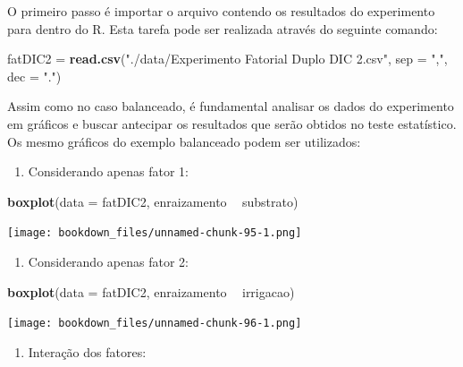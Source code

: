 \documentclass[
]{article}
\newenvironment{Shaded}{\begin{snugshade}}{\end{snugshade}}
\newcommand{\DataTypeTok}[1]{\textcolor[rgb]{0.13,0.29,0.53}{#1}}
\newcommand{\KeywordTok}[1]{\textcolor[rgb]{0.13,0.29,0.53}{\textbf{#1}}}
\newcommand{\NormalTok}[1]{#1}
\newcommand{\OperatorTok}[1]{\textcolor[rgb]{0.81,0.36,0.00}{\textbf{#1}}}
\newcommand{\StringTok}[1]{\textcolor[rgb]{0.31,0.60,0.02}{#1}}
\providecommand{\tightlist}{%
  \setlength{\itemsep}{0pt}\setlength{\parskip}{0pt}}
\begin{document}
O primeiro passo é importar o arquivo contendo os resultados do experimento para dentro do R. Esta tarefa pode ser realizada através do seguinte comando:

\begin{Shaded}
\begin{Highlighting}[]
\NormalTok{fatDIC2 =}\StringTok{ }\KeywordTok{read.csv}\NormalTok{(}\StringTok{"./data/Experimento Fatorial Duplo DIC 2.csv"}\NormalTok{, }
                   \DataTypeTok{sep =} \StringTok{","}\NormalTok{, }\DataTypeTok{dec =} \StringTok{"."}\NormalTok{)}
\end{Highlighting}
\end{Shaded}

Assim como no caso balanceado, é fundamental analisar os dados do experimento em gráficos e buscar antecipar os resultados que serão obtidos no teste estatístico. Os mesmo gráficos do exemplo balanceado podem ser utilizados:

\begin{enumerate}
\def\labelenumi{\arabic{enumi}.}
\tightlist
\item
  Considerando apenas fator 1:
\end{enumerate}

\begin{Shaded}
\begin{Highlighting}[]
\KeywordTok{boxplot}\NormalTok{(}\DataTypeTok{data =}\NormalTok{ fatDIC2, enraizamento }\OperatorTok{~}\StringTok{ }\NormalTok{substrato)}
\end{Highlighting}
\end{Shaded}

\texttt{[image: bookdown\_files/unnamed-chunk-95-1.png]}

\begin{enumerate}
\def\labelenumi{\arabic{enumi}.}
\setcounter{enumi}{1}
\tightlist
\item
  Considerando apenas fator 2:
\end{enumerate}

\begin{Shaded}
\begin{Highlighting}[]
\KeywordTok{boxplot}\NormalTok{(}\DataTypeTok{data =}\NormalTok{ fatDIC2, enraizamento }\OperatorTok{~}\StringTok{ }\NormalTok{irrigacao)}
\end{Highlighting}
\end{Shaded}

\texttt{[image: bookdown\_files/unnamed-chunk-96-1.png]}

\begin{enumerate}
\def\labelenumi{\arabic{enumi}.}
\setcounter{enumi}{2}
\tightlist
\item
  Interação dos fatores:
\end{enumerate}
\end{document}
